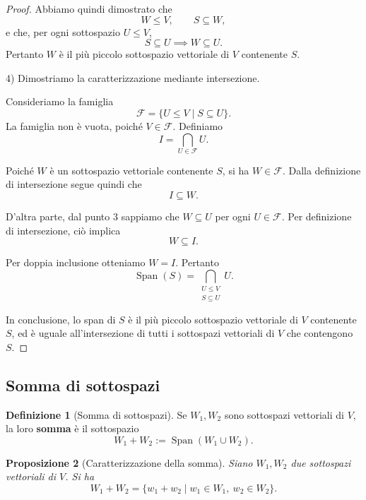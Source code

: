 \documentclass[11pt,a4paper]{article}
\theoremstyle{plain}
\newtheorem{prop}{Proposizione}[section]
\theoremstyle{definition}
\newtheorem{defn}[prop]{Definizione}
\theoremstyle{remark}
\begin{document}
\begin{proof}
    Abbiamo quindi dimostrato che
    \[
    W\leq V,\qquad S\subseteq W,
    \]
    e che, per ogni sottospazio \(U\leq V\),
    \[
    S\subseteq U\implies W\subseteq U.
    \]
    Pertanto \(W\) è il più piccolo sottospazio vettoriale di \(V\) contenente \(S\).

    4) Dimostriamo la caratterizzazione mediante intersezione.

    Consideriamo la famiglia
    \[
    \mathcal{F}=\{U\leq V\mid S\subseteq U\}.
    \]
    La famiglia non è vuota, poiché \(V\in\mathcal{F}\). Definiamo
    \[
    I=\bigcap_{U\in\mathcal{F}}U.
    \]

    Poiché \(W\) è un sottospazio vettoriale contenente \(S\), si ha \(W\in\mathcal{F}\). Dalla definizione di intersezione segue quindi che
    \[
    I\subseteq W.
    \]

    D'altra parte, dal punto 3 sappiamo che \(W\subseteq U\) per ogni \(U\in\mathcal{F}\). Per definizione di intersezione, ciò implica
    \[
    W\subseteq I.
    \]

    Per doppia inclusione otteniamo \(W=I\). Pertanto
    \[
    \boxed{
    \operatorname{Span}(S)
    =
    \bigcap_{\substack{U\leq V\\S\subseteq U}}U
    }.
    \]

    In conclusione, lo span di \(S\) è il più piccolo sottospazio vettoriale di \(V\) contenente \(S\), ed è uguale all'intersezione di tutti i sottospazi vettoriali di \(V\) che contengono \(S\).
\end{proof}

\subsection{Somma di sottospazi}

\begin{defn}[Somma di sottospazi]
    Se $W_1,W_2$ sono sottospazi vettoriali di $V$, la loro \textbf{somma} è il sottospazio
    \[
        W_1+W_2 := \operatorname{Span}(W_1\cup W_2).
    \]
\end{defn}

\begin{prop}[Caratterizzazione della somma]
    Siano $W_1,W_2$ due sottospazi vettoriali di $V$. Si ha
    \[
        W_1+W_2
        =
        \{w_1+w_2\mid w_1\in W_1,\ w_2\in W_2\}.
    \]
\end{prop}
\end{document}
